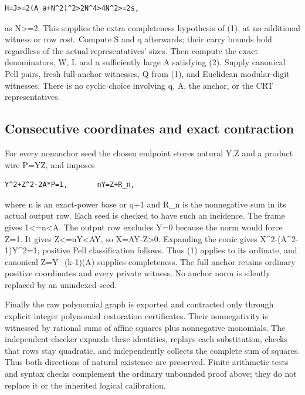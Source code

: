 \begin{verbatim}
H=J>=2(A_a+N^2)^2>2N^4>4N^2>=2s,
\end{verbatim}

as N\textgreater{}\allowbreak{}=\allowbreak{}2. This supplies the extra completeness hypothesis of (1), at no additional witness or row cost. Compute S and q afterwards; their carry bounds hold regardless of the actual representatives' sizes. Then compute the exact denominators, W, L and a sufficiently large A satisfying (2). Supply canonical Pell pairs, fresh full-anchor witnesses, Q from (1), and Euclidean modular-digit witnesses. There is no cyclic choice involving q, A, the anchor, or the CRT representatives.



\subsection{Consecutive coordinates and exact contraction}



For every nonanchor seed the chosen endpoint stores natural Y,Z and a product wire P=\allowbreak{}YZ, and imposes



\begin{verbatim}
Y^2+Z^2-2A*P=1,       nY=Z+R_n,
\end{verbatim}

where n is an exact-power base or q+\allowbreak{}1 and R\_\allowbreak{}n is the nonnegative sum in its actual output row. Each seed is checked to have such an incidence. The frame gives 1\textless{}\allowbreak{}=\allowbreak{}n\textless{}\allowbreak{}A. The output row excludes Y=\allowbreak{}0 because the norm would force Z=\allowbreak{}1. It gives Z\textless{}\allowbreak{}=\allowbreak{}nY\textless{}\allowbreak{}AY, so X=\allowbreak{}AY-Z\textgreater{}\allowbreak{}0. Expanding the conic gives X\textasciicircum{}\allowbreak{}2-(A\textasciicircum{}\allowbreak{}2-1)Y\textasciicircum{}\allowbreak{}2=\allowbreak{}1; positive Pell classification follows. Thus (1) applies to its ordinate, and canonical Z=\allowbreak{}Y\_\allowbreak{}(k-1)(A) supplies completeness. The full anchor retains ordinary positive coordinates and every private witness. No anchor norm is silently replaced by an unindexed seed.



Finally the raw polynomial graph is exported and contracted only through explicit integer polynomial restoration certificates. Their nonnegativity is witnessed by rational sums of affine squares plus nonnegative monomials. The independent checker expands these identities, replays each substitution, checks that rows stay quadratic, and independently collects the complete sum of squares. Thus both directions of natural existence are preserved. Finite arithmetic tests and syntax checks complement the ordinary unbounded proof above; they do not replace it or the inherited logical calibration.



